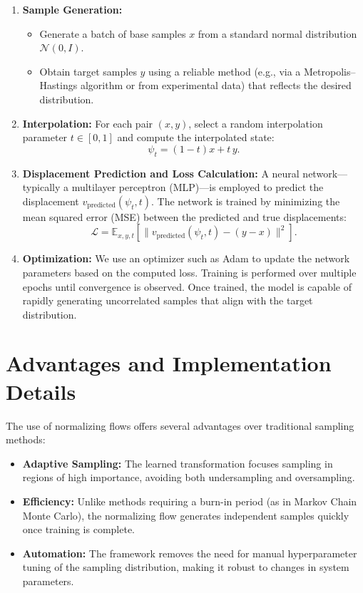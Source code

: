 \begin{enumerate}
    \item \textbf{Sample Generation:} 
    \begin{itemize}
        \item Generate a batch of base samples \( x \) from a standard normal distribution \( \mathcal{N}(0, I) \).
        \item Obtain target samples \( y \) using a reliable method (e.g., via a Metropolis--Hastings algorithm or from experimental data) that reflects the desired distribution.
    \end{itemize}
    
    \item \textbf{Interpolation:} 
    For each pair \( (x, y) \), select a random interpolation parameter \( t \in [0,1] \) and compute the interpolated state:
    \[
    \psi_t = (1-t)x + t\, y.
    \]
    
    \item \textbf{Displacement Prediction and Loss Calculation:}
    A neural network—typically a multilayer perceptron (MLP)—is employed to predict the displacement \( v_{\text{predicted}}(\psi_t, t) \). The network is trained by minimizing the mean squared error (MSE) between the predicted and true displacements:
    \[
    \mathcal{L} = \mathbb{E}_{x,y,t} \left[ \| v_{\text{predicted}}(\psi_t, t) - (y - x) \|^2 \right].
    \]
    
    \item \textbf{Optimization:} 
    We use an optimizer such as Adam to update the network parameters based on the computed loss. Training is performed over multiple epochs until convergence is observed. Once trained, the model is capable of rapidly generating uncorrelated samples that align with the target distribution.
\end{enumerate}

\section{Advantages and Implementation Details}
The use of normalizing flows offers several advantages over traditional sampling methods:
\begin{itemize}
    \item \textbf{Adaptive Sampling:} The learned transformation focuses sampling in regions of high importance, avoiding both undersampling and oversampling.
    \item \textbf{Efficiency:} Unlike methods requiring a burn-in period (as in Markov Chain Monte Carlo), the normalizing flow generates independent samples quickly once training is complete.
    \item \textbf{Automation:} The framework removes the need for manual hyperparameter tuning of the sampling distribution, making it robust to changes in system parameters.
\end{itemize}

